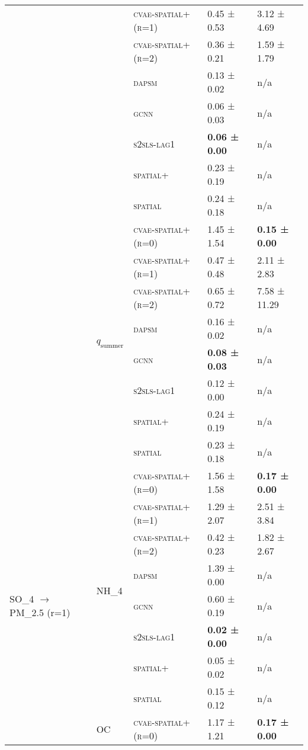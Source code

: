 \documentclass{article}
\begin{document}
\begin{table}[!tbp]
\begin{tabular}{lllll}
 &  & \textsc{cvae-spatial+ (r=1)} & 0.45 ± {\small 0.53} & 3.12 ± {\small 4.69} \\
 &  & \textsc{cvae-spatial+ (r=2)} & 0.36 ± {\small 0.21} & 1.59 ± {\small 1.79} \\
 &  & \textsc{dapsm} & 0.13 ± {\small 0.02} & n/a \\
 &  & \textsc{gcnn} & 0.06 ± {\small 0.03} & n/a \\
 &  & \textsc{s2sls-lag1} & \bf 0.06 ± {\small 0.00} & n/a \\
 &  & \textsc{spatial+} & 0.23 ± {\small 0.19} & n/a \\
 &  & \textsc{spatial} & 0.24 ± {\small 0.18} & n/a \\
\cline{2-5}
 & \multirow[t]{8}{*}{$q_{\text{summer}}$} & \textsc{cvae-spatial+ (r=0)} & 1.45 ± {\small 1.54} & \bf 0.15 ± {\small 0.00} \\
 &  & \textsc{cvae-spatial+ (r=1)} & 0.47 ± {\small 0.48} & 2.11 ± {\small 2.83} \\
 &  & \textsc{cvae-spatial+ (r=2)} & 0.65 ± {\small 0.72} & 7.58 ± {\small 11.29} \\
 &  & \textsc{dapsm} & 0.16 ± {\small 0.02} & n/a \\
 &  & \textsc{gcnn} & \bf 0.08 ± {\small 0.03} & n/a \\
 &  & \textsc{s2sls-lag1} & 0.12 ± {\small 0.00} & n/a \\
 &  & \textsc{spatial+} & 0.24 ± {\small 0.19} & n/a \\
 &  & \textsc{spatial} & 0.23 ± {\small 0.18} & n/a \\
\cline{1-5} \cline{2-5}
\multirow[t]{16}{*}{SO_{4} $\to$ PM_{2.5} (r=1)} & \multirow[t]{8}{*}{NH_4} & \textsc{cvae-spatial+ (r=0)} & 1.56 ± {\small 1.58} & \bf 0.17 ± {\small 0.00} \\
 &  & \textsc{cvae-spatial+ (r=1)} & 1.29 ± {\small 2.07} & 2.51 ± {\small 3.84} \\
 &  & \textsc{cvae-spatial+ (r=2)} & 0.42 ± {\small 0.23} & 1.82 ± {\small 2.67} \\
 &  & \textsc{dapsm} & 1.39 ± {\small 0.00} & n/a \\
 &  & \textsc{gcnn} & 0.60 ± {\small 0.19} & n/a \\
 &  & \textsc{s2sls-lag1} & \bf 0.02 ± {\small 0.00} & n/a \\
 &  & \textsc{spatial+} & 0.05 ± {\small 0.02} & n/a \\
 &  & \textsc{spatial} & 0.15 ± {\small 0.12} & n/a \\
\cline{2-5}
 & \multirow[t]{8}{*}{OC} & \textsc{cvae-spatial+ (r=0)} & 1.17 ± {\small 1.21} & \bf 0.17 ± {\small 0.00} \\

\end{tabular}
\end{table}
\end{document}
